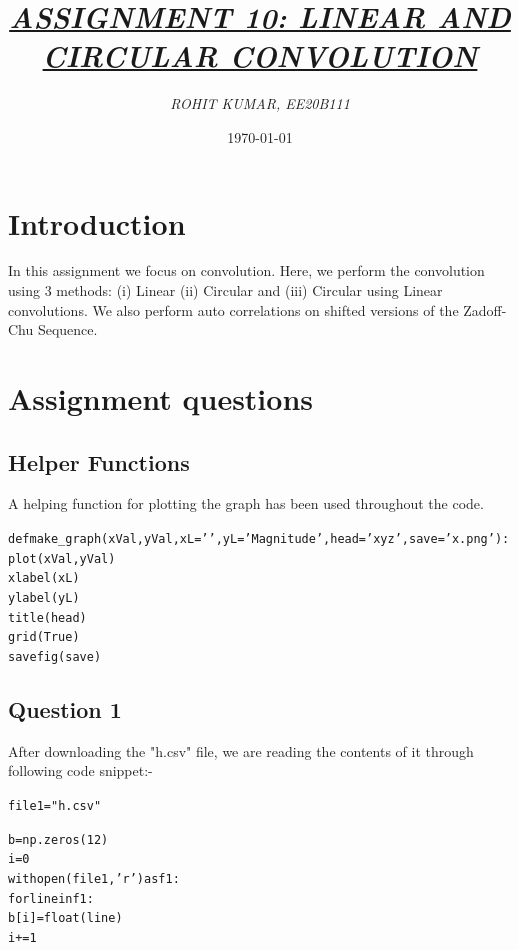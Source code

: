 \documentclass{article}
\title{\underline{\textit{\Large{ASSIGNMENT 10: LINEAR AND CIRCULAR CONVOLUTION}}}}
\author{\textit{ROHIT KUMAR, EE20B111}}
\date{\today}
\begin{document}
\maketitle

\section{Introduction}
In this assignment we focus on convolution. Here, we perform the convolution using 3 methods:  (i) Linear (ii) Circular and (iii) Circular using Linear convolutions. We also perform auto correlations on shifted versions of the Zadoff-Chu Sequence.

\section{Assignment questions}

\subsection{Helper Functions}
A helping function for plotting the graph has been used throughout the code.
\lstset{language=Python}
\lstset{frame=lines}
\lstset{basicstyle=\footnotesize}
\begin{alltt}
def make_graph(xVal, yVal, xL = '\omega', yL = 'Magnitude', head = 'xyz', save = 'x.png'):
    plot(xVal, yVal)
    xlabel(xL)
    ylabel(yL)
    title(head)
    grid(True)
    savefig(save) 
\end{alltt}

\subsection{Question 1}
After downloading the "h.csv" file, we are reading the contents of it through following code snippet:- 
\begin{alltt}
file1 = "h.csv"

b = np.zeros(12)
i = 0
with open(file1, 'r') as f1:  
    for line in f1:
        b[i] = float(line) 
        i += 1
\end{alltt}
\end{document}
